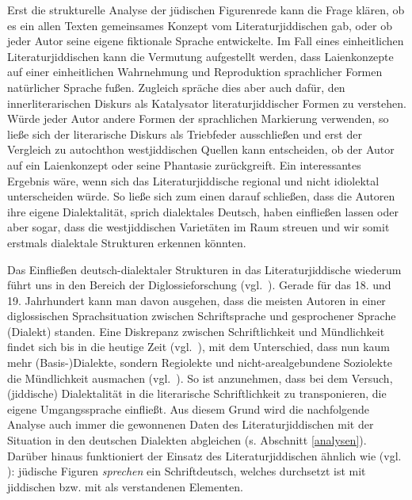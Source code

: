 Erst die strukturelle Analyse der jüdischen Figurenrede kann die Frage klären, ob es ein allen Texten gemeinsames Konzept vom Literaturjiddischen gab, oder ob jeder Autor seine eigene fiktionale Sprache entwickelte. %
Im Fall eines einheitlichen Literaturjiddischen kann die Vermutung aufgestellt werden, dass Laienkonzepte auf einer einheitlichen Wahrnehmung und Reproduktion sprachlicher Formen natürlicher Sprache fußen. Zugleich spräche dies aber auch dafür, den innerliterarischen Diskurs als Katalysator literaturjiddischer Formen zu verstehen. Würde jeder Autor andere Formen der sprachlichen Markierung verwenden, so ließe sich der literarische Diskurs als Triebfeder ausschließen und erst der Vergleich zu autochthon westjiddischen Quellen kann entscheiden, ob der Autor auf ein Laienkonzept oder seine Phantasie zurückgreift. Ein interessantes Ergebnis wäre, wenn sich das Literaturjiddische regional und nicht idiolektal unterscheiden würde. So ließe sich zum einen darauf schließen, dass die Autoren ihre eigene Dialektalität, sprich dialektales Deutsch, haben einfließen lassen oder aber sogar, dass die westjiddischen Varietäten im Raum streuen und wir somit erstmals dialektale Strukturen erkennen könnten.

  
Das Einfließen deutsch-dialektaler Strukturen in das Literaturjiddische wiederum führt uns in den Bereich der Diglossieforschung (vgl.\, \citealt{Ferguson1959}). Gerade für das 18. und 19. Jahrhundert kann man davon ausgehen, dass die meisten Autoren in einer diglossischen Sprachsituation zwischen Schriftsprache und gesprochener Sprache (Dialekt) standen. Eine Diskrepanz zwischen Schriftlichkeit und Mündlichkeit findet sich bis in die heutige Zeit (vgl.\, \citealt{KochOesterreicher1985}), mit dem Unterschied, dass nun kaum mehr (Basis-)Dialekte, sondern Regiolekte und nicht-arealgebundene Soziolekte die Mündlichkeit ausmachen (vgl.\, \citealt{SchmidtHerrgen2011}). So ist anzunehmen, dass bei dem Versuch, (jiddische) Dialektalität in die literarische Schriftlichkeit zu transponieren, die eigene Umgangssprache einfließt. Aus diesem Grund wird die nachfolgende Analyse auch immer die gewonnenen Daten des Literaturjiddischen mit der Situation in den deutschen Dialekten abgleichen (s. Abschnitt \ref{analysen}). Darüber hinaus funktioniert der Einsatz des Literaturjiddischen ähnlich wie  (vgl.\, \citealt{MyersScotton2004,MyersScotton2002}): jüdische Figuren \textit{sprechen} ein Schriftdeutsch, welches durchsetzt ist mit jiddischen bzw. mit als  verstandenen Elementen.  

